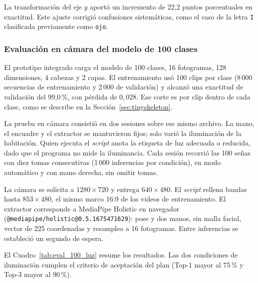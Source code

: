 La transformación del eje $y$ aportó un incremento de 22,2 puntos porcentuales en exactitud. Este ajuste corrigió confusiones sistemáticas, como el caso de la letra \texttt{I} clasificada previamente como \texttt{ojo}.

\subsubsection{Evaluación en cámara del modelo de 100 clases}
\label{sec:eval_100_camara}
\label{sec:protocolo_camara}

El prototipo integrado carga el modelo de 100 clases, 16 fotogramas, 128 dimensiones, 4 cabezas y 2 capas. El entrenamiento usó 100 clips por clase (8\,000 secuencias de entrenamiento y 2\,000 de validación) y alcanzó una exactitud de validación del 99{,}0\,\%, con pérdida de $0{,}028$. Ese corte es por clip dentro de cada clase, como se describe en la Sección~\ref{sec:tinyskeleton}.

La prueba en cámara consistió en dos sesiones sobre ese mismo archivo. La mano, el encuadre y el extractor se mantuvieron fijos; solo varió la iluminación de la habitación. Quien ejecuta el \textit{script} anota la etiqueta de luz adecuada o reducida, dado que el programa no mide la iluminancia. Cada sesión recorrió las 100 señas con diez tomas consecutivas (1\,000 inferencias por condición), en modo automático y con mano derecha, sin omitir tomas.

La cámara se solicita a $1280\times 720$ y entrega $640\times 480$. El \textit{script} rellena bandas hasta $853\times 480$, el mismo marco 16:9 de los videos de entrenamiento. El extractor corresponde a MediaPipe Holistic en navegador (\texttt{@mediapipe/holistic@0.5.1675471629}): pose y dos manos, sin malla facial, vector de 225 coordenadas y resampleo a 16 fotogramas. Entre inferencias se estableció un segundo de espera.

El Cuadro~\ref{tab:eval_100_luz} resume los resultados. Las dos condiciones de iluminación cumplen el criterio de aceptación del plan (Top-1 mayor al 75\,\% y Top-3 mayor al 90\,\%).


